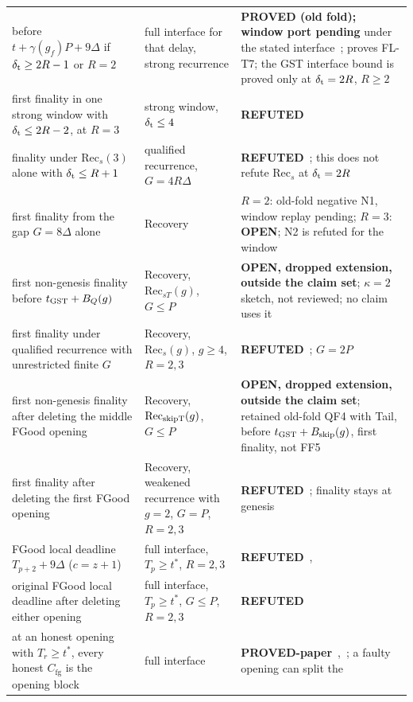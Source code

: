 \documentclass{article}
\theoremstyle{plain}
\theoremstyle{definition}
\theoremstyle{remark}
\newcommand{\Cfg}{C_{\mathrm{fg}}}
\newcommand{\OPEN}{\textbf{OPEN}}
\newcommand{\REFUTED}{\textbf{REFUTED}}
\begin{document}
\begin{center}
\begin{longtable}{>{\raggedright\arraybackslash}p{5.4cm}
  >{\raggedright\arraybackslash}p{1.9cm}
  >{\raggedright\arraybackslash}p{5.6cm}}
  before $t+\gamma(g_f)P+9\Delta$ if $\delta_{\rm t}\geq2R-1$
  or $R=2$ & full interface for that delay, strong recurrence &
  \textbf{PROVED (old fold); window port pending} under the stated interface~\cite[FL-RF, FL-D, FL-T7]{BPF};
  \nameref{par:first-crossing} proves FL-T7; the GST interface
  bound is proved only at $\delta_{\rm t}=2R$, $R\geq2$\\
first finality in one strong window with $\delta_{\rm t}\leq2R-2$, at
  $R=3$ & strong window, $\delta_{\rm t}\leq4$ &
  \REFUTED~\cite[T5, N2]{FL}\\
finality under $\mathrm{Rec}_{s}(3)$ alone with
  $\delta_{\rm t}\leq R+1$ & qualified recurrence, $G=4R\Delta$ &
  \REFUTED~\cite[N4]{BPF}; this does not refute
  $\mathrm{Rec}_{s}$ at $\delta_{\rm t}=2R$\\
first finality from the gap $G=8\Delta$ alone & Recovery &
  $R=2$: old-fold negative N1, window replay pending;
  $R=3$: \OPEN{}; N2 is refuted for the window~\cite[N1, N2]{BPF}\\
first non-genesis finality before $t_{\rm GST}+B_Q(g)$ &
  Recovery, $\mathrm{Rec}_{sT}(g)$, $G\leq P$ &
  \textbf{OPEN, dropped extension, outside the claim set}; $\kappa=2$ sketch,
  not reviewed; no claim uses it~\cite[QF2-W, FT-Tail-W]{BPF}\\
first finality under qualified recurrence with unrestricted finite $G$ &
  Recovery, $\mathrm{Rec}_{s}(g)$, $g\geq4$, $R=2,3$ &
  \REFUTED~\cite[QF1, N5]{BPF}; $G=2P$\\
first non-genesis finality after deleting the middle FGood opening &
  Recovery, $\mathrm{Rec}_{\rm skipT}(g)$, $G\leq P$ &
  \textbf{OPEN, dropped extension, outside the claim set}; retained old-fold QF4 with Tail,
  before $t_{\rm GST}+B_{\rm skip}(g)$,
  first finality, not FF5\\
first finality after deleting the first FGood opening &
  Recovery, weakened recurrence with $g=2$, $G=P$, $R=2,3$ &
  \REFUTED~\cite[QF3, N6]{BPF}; finality stays at genesis\\
FGood local deadline $T_{p+2}+9\Delta$ ($c=z+1$) &
  full interface, $T_p\geq t^*$, $R=2,3$ &
  \REFUTED~\cite[\S A]{NRBC},~\cite[\S2]{NRB}\\
original FGood local deadline after deleting either opening &
  full interface, $T_p\geq t^*$, $G\leq P$, $R=2,3$ &
  \REFUTED~\cite[QF5, N6--N7]{BPF}\\
at an honest opening with $T_r\geq t^*$, every honest $\Cfg$
  is the opening block & full interface &
  \textbf{PROVED-paper}~\cite[H3]{BPH},~\cite[FF1]{BPF}; a faulty opening can split the

\end{longtable}
\end{center}
\end{document}

